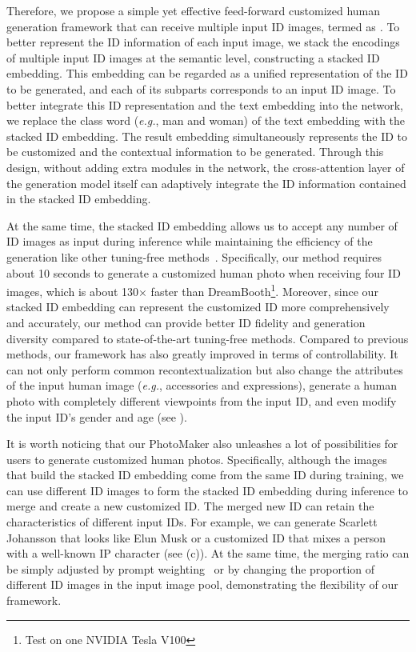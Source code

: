 Therefore, we propose a simple yet effective feed-forward customized human generation framework that can receive multiple input ID images, termed as \textit{\methodname.} 
To better represent the ID information of each input image, we stack the encodings of multiple input ID images at the semantic level, constructing a stacked ID embedding. 
This embedding can be regarded as a unified representation of the ID to be generated, and each of its subparts corresponds to an input ID image.
To better integrate this ID representation and the text embedding into the network, we replace the class word (\textit{e.g.}, man and woman) of the text embedding with the stacked ID embedding. 
The result embedding simultaneously represents the ID to be customized and the contextual information to be generated.
Through this design, without adding extra modules in the network, the cross-attention layer of the generation model itself can adaptively integrate the ID information contained in the stacked ID embedding.

At the same time, the stacked ID embedding allows us to accept any number of ID images as input during inference while maintaining the efficiency of the generation like other tuning-free methods~\cite{shi2023instantbooth, xiao2023fastcomposer}. 
Specifically, our method requires about 10 seconds to generate a customized human photo when receiving four ID images, which is about 130$\times$  faster than DreamBooth\footnote{Test on one NVIDIA Tesla V100}.
Moreover, since our stacked ID embedding can represent the customized ID more comprehensively and accurately, our method can provide better ID fidelity and generation diversity compared to state-of-the-art tuning-free methods. 
Compared to previous methods, our framework has also greatly improved in terms of controllability. 
It can not only perform common recontextualization but also change the attributes of the input human image (\textit{e.g.}, accessories and expressions), generate a human photo with completely different viewpoints from the input ID, and even modify the input ID's gender and age (see ).

It is worth noticing that our PhotoMaker 
also unleashes a lot of possibilities for users to generate customized human photos. 
Specifically, although the images that build the stacked ID embedding come from the same ID during training, we can use different ID images to form the stacked ID embedding during inference to merge and create a new customized ID. 
The merged new ID can retain the characteristics of different input IDs. 
For example, we can generate Scarlett Johansson that looks like  Elun Musk or a customized ID that mixes a person with a well-known IP character (see (c)).
At the same time, the merging ratio can be simply adjusted by prompt weighting~\cite{hertz2022prompt, prompt_weighting} or by changing the proportion of different ID images in the input image pool, demonstrating the flexibility of our framework.

